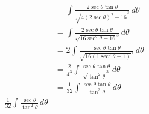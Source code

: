 \documentclass[preview]{standalone}
\begin{document}
\begin{align*}
&= \int \frac{2\sec\theta\tan\theta}{\sqrt{4(2\sec\theta)^2-16}^3} \, d\theta \\ &=\int \frac{2\sec\theta\tan\theta}{\sqrt{16\sec^2\theta-16}^3} \, d\theta \\ &=2\int \frac{\sec\theta\tan\theta}{\sqrt{16(1\sec^2\theta-1)}^3} \, d\theta \\ &=\frac{2}{4^3} \int \frac{\sec\theta\tan\theta}{\sqrt{\tan^2\theta}^3} \, d\theta \\ &=\frac{1}{32} \int \frac{\sec\theta\tan\theta}{\tan^3\theta} \, d\theta \\ \frac{1}{32} \int \frac{\sec\theta}{\tan^2\theta }\, d\theta
\end{align*}
\end{document}
